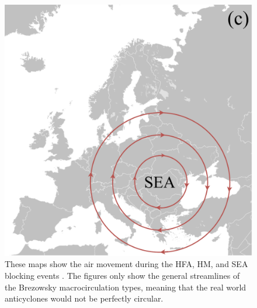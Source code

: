\begin{figure}[H]
\begin{minipage}{0.32\textwidth}
    \end{minipage}
    \hfill
    \begin{minipage}{0.32\textwidth}
        \includegraphics[width=\linewidth]{Figures/SEA.pdf}
    \end{minipage}
    \caption{These maps show the air movement during the HFA, HM, and SEA blocking events \cite{siglermarianBlankMapEurope2007}. The figures only show the general streamlines of the Brezowsky macrocirculation types, meaning that the real world anticyclones would not be perfectly circular.}
    \label{fig:map}
\end{figure}

